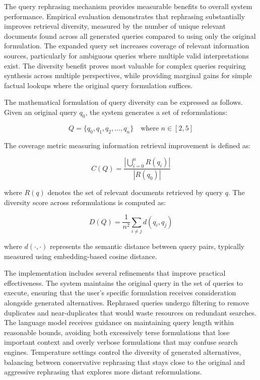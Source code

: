 The query rephrasing mechanism provides measurable benefits to overall system performance. Empirical evaluation demonstrates that rephrasing substantially improves retrieval diversity, measured by the number of unique relevant documents found across all generated queries compared to using only the original formulation. The expanded query set increases coverage of relevant information sources, particularly for ambiguous queries where multiple valid interpretations exist. The diversity benefit proves most valuable for complex queries requiring synthesis across multiple perspectives, while providing marginal gains for simple factual lookups where the original query formulation suffices.

\newpage

The mathematical formulation of query diversity can be expressed as follows. Given an original query $q_0$, the system generates a set of reformulations:

\begin{equation}
Q = \{q_0, q_1, q_2, \ldots, q_n\} \quad \text{where } n \in [2,5]
\label{eq:query_set}
\end{equation}

The coverage metric measuring information retrieval improvement is defined as:

\begin{equation}
C(Q) = \frac{\left|\bigcup_{i=0}^{n} R(q_i)\right|}{|R(q_0)|}
\label{eq:coverage}
\end{equation}

where $R(q)$ denotes the set of relevant documents retrieved by query $q$. The diversity score across reformulations is computed as:

\begin{equation}
D(Q) = \frac{1}{n^2} \sum_{i \neq j} d(q_i, q_j)
\label{eq:diversity}
\end{equation}

where $d(\cdot, \cdot)$ represents the semantic distance between query pairs, typically measured using embedding-based cosine distance.

The implementation includes several refinements that improve practical effectiveness. The system maintains the original query in the set of queries to execute, ensuring that the user's specific formulation receives consideration alongside generated alternatives. Rephrased queries undergo filtering to remove duplicates and near-duplicates that would waste resources on redundant searches. The language model receives guidance on maintaining query length within reasonable bounds, avoiding both excessively terse formulations that lose important context and overly verbose formulations that may confuse search engines. Temperature settings control the diversity of generated alternatives, balancing between conservative rephrasing that stays close to the original and aggressive rephrasing that explores more distant reformulations.

